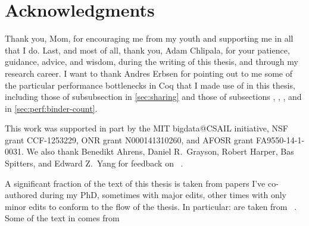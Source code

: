 % 

\cleardoublepage

\section*{Acknowledgments}

Thank you, Mom, for encouraging me from my youth and supporting me in all that I do.  Last, and most of all, thank you, Adam Chlipala, for your patience, guidance, advice, and wisdom, during the writing of this thesis, and through my research career.
I want to thank Andres Erbsen for pointing out to me some of the particular performance bottlenecks in Coq that I made use of in this thesis, including those of subsubsection  in \autoref{sec:sharing} and those of subsections , , , and  in \autoref{sec:perf:binder-count}.

This work was supported in part by the MIT bigdata@CSAIL initiative, NSF grant CCF-1253229, ONR grant N000141310260, and AFOSR grant FA9550-14-1-0031.
We also thank Benedikt Ahrens, Daniel R.~Grayson, Robert Harper, Bas Spitters, and Edward Z.~Yang for feedback on ~\cite{category-coq-experience}.

A significant fraction of the text of this thesis is taken from papers I've co-authored during my PhD, sometimes with major edits, other times with only minor edits to conform to the flow of the thesis.
In particular:
 are taken from ~\cite{category-coq-experience}.
Some of the text in  comes from ~\cite{category-coq-experience}

